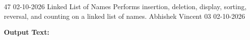 \clearpage
\label{prog:47}
\programhead
  {47}
  {02-10-2026}
  {Linked List of Names}
  {Performs insertion, deletion, display, sorting, reversal, and counting on a linked list of names.}
  {Abhishek Vincent}
  {03}
  {02-10-2026}

\divider
\textbf{Output Text:}\par
\vspace{2pt}

